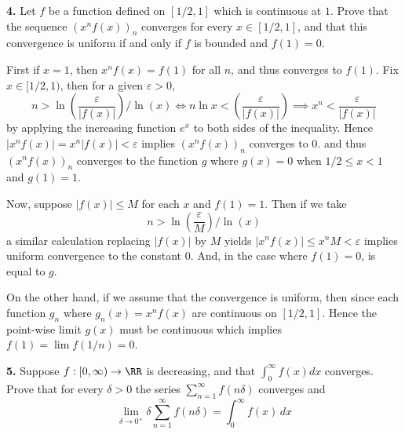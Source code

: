\documentclass{homework}
\author{Kevin Joyce}
\begin{document}
 
\newcommand{\figref}[1]{\figurename~\ref{#1}}
\renewcommand{\bar}{\overline}
\renewcommand{\hat}{\widehat}
\renewcommand{\SS}{\mathcal S}
\newcommand{\eps}{\varepsilon}
\newcommand{\TTheta}{\overline{\underline \Theta} }
\newcommand{\del}{\partial}
\newcommand{\approxsim}{\overset{\cdotp}{\underset{\cdotp}{\sim}}}
\newcommand{\FF}{\mathcal F}
\renewcommand{\Re}{\mathrm{Re}\,}
\renewcommand{\Im}{\mathrm{Im}\,}
\newcommand{\HH}{\mathcal H}
\nocite{*}

{\bf 4.} Let $f$ be a function defined on $[1/2,1]$ which is continuous at $1$.  Prove that the sequence $(x^nf(x))_n$ converges for every $x\in [1/2,1]$, and that this convergence is uniform if and only if $f$ is bounded and $f(1) = 0$.

\begin{solution}
  First if $x = 1$, then $x^nf(x) = f(1)$ for all $n$, and thus converges to $f(1)$.  Fix $x\in [1/2,1)$, then for a given $\eps >0$,  
  $$
    n> \ln \left(\frac {\eps}{|f(x)|} \right)/\ln(x) \iff n \ln x  < \left(\frac {\eps}{|f(x)|} \right) \implies x^n < \frac{\eps}{|f(x)|}
  $$
  by applying the increasing function $e^x$ to both sides of the inequality.
  Hence $ |x^nf(x)| = x^n|f(x)| < \eps $ implies $(x^nf(x))_n$ converges to $0$.  
  and thus $(x^nf(x))_n$ converges to the function $g$ where $g(x) = 0$ when $1/2\le x <1$ and $g(1) = 1$.

  Now, suppose $|f(x)| \le M$ for each $x$ and $f(1) = 1$.  Then if we take
  $$
    n> \ln \left(\frac {\eps}{M} \right)/\ln(x) 
  $$
  a similar calculation replacing $|f(x)|$ by $M$ yields $|x^nf(x)| \le x^n M < \eps$ implies uniform convergence to the constant $0$.  And, in the case where $f(1) = 0$, is equal to $g$.

  On the other hand, if we assume that the convergence is uniform, then  since each function $g_n$ where $g_n(x) = x^nf(x)$ are continuous on $[1/2,1]$.  Hence the point-wise limit $g(x)$ must be continuous which implies $f(1) = \lim f(1/n) = 0$.
\end{solution}

{\bf 5.} Suppose $f:[0,\infty) \to \RR$ is decreasing, and that $\int_0^\infty f(x) dx$ converges.  Prove that for every $\delta > 0$ the series $\sum_{n=1}^\infty f(n\delta)$ converges and
$$
  \lim_{\delta \to 0^+} \delta \sum_{n=1}^\infty f(n\delta) = \int_0^\infty f(x)\,dx
$$
\end{document}
